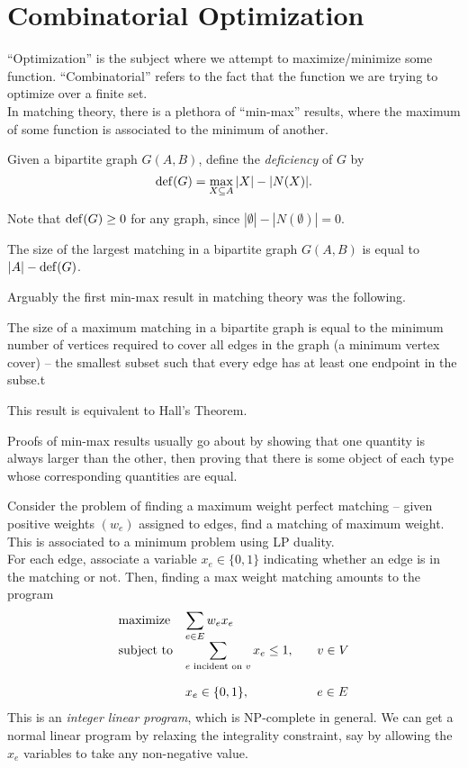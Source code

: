 
\section{Combinatorial Optimization}

	``Optimization'' is the subject where we attempt to maximize/minimize some function. ``Combinatorial'' refers to the fact that the function we are trying to optimize over a finite set.\\
	In matching theory, there is a plethora of ``min-max'' results, where the maximum of some function is associated to the minimum of another.

	\begin{fdef}
		Given a bipartite graph $G(A,B)$, define the \emph{deficiency} of $G$ by
		\[ \operatorname{def}(G) = \max_{X \subseteq A} |X| - |N(X)|. \]
	\end{fdef}
	Note that $\operatorname{def}(G) \ge 0$ for any graph, since $|\emptyset| - |N(\emptyset)| = 0$.

	\begin{fprop}
		The size of the largest matching in a bipartite graph $G(A,B)$ is equal to $|A| - \operatorname{def}(G)$.
	\end{fprop}

	Arguably the first min-max result in matching theory was the following.

	\begin{ftheo}
		\label{theo: konigs theorem}
		The size of a maximum matching in a bipartite graph is equal to the minimum number of vertices required to cover all edges in the graph (a minimum vertex cover) -- the smallest subset such that every edge has at least one endpoint in the subse.t
	\end{ftheo}
	This result is equivalent to Hall's Theorem.

	Proofs of min-max results usually go about by showing that one quantity is always larger than the other, then proving that there is some object of each type whose corresponding quantities are equal.

	Consider the problem of finding a maximum weight perfect matching -- given positive weights $(w_e)$ assigned to edges, find a matching of maximum weight. This is associated to a minimum problem using LP duality.\\
	For each edge, associate a variable $x_e \in \{0,1\}$ indicating whether an edge is in the matching or not. Then, finding a max weight matching amounts to the program
	\[
	\begin{array}{ll@{}ll}
	\text{maximize}  & \displaystyle\sum_{e \in E} w_{e} x_{e} &\\
	\text{subject to}& \displaystyle\sum\limits_{e \text{ incident on } v} x_{e} \le 1,  &\qquad v \in V\\\\
	                 & x_{e} \in \{0,1\},                                                &\qquad e \in E
	\end{array}
	\]
	This is an \emph{integer linear program}, which is \textsf{NP}-complete in general. We can get a normal linear program by relaxing the integrality constraint, say by allowing the $x_e$ variables to take any non-negative value.

